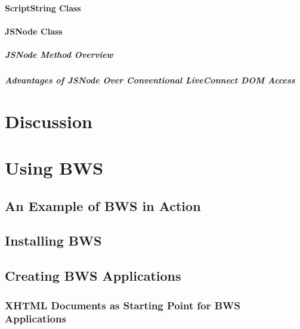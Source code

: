    \subsubsection{ScriptString Class}
    \label{sec:scriptString}
     
     
    \subsubsection{JSNode Class}
    
     
     
     \paragraph{JSNode Method Overview}
     
      
      
     \paragraph{Advantages of JSNode Over Conventional LiveConnect DOM Access}
     
      
     
\chapter{Discussion}
 \label{sec:discussion}
 

\chapter{Using BWS}
 \label{sec:usingBWS}
 

 \section{An Example of BWS in Action}
 \section{Installing BWS}
 
  
  
 \section{Creating BWS Applications}
 \label{sec:CreatingBWSApplications}
 
  \subsection{XHTML Documents as Starting Point for BWS Applications}
  \label{sec:XHTMLDocumentsAsStartingPoint}


